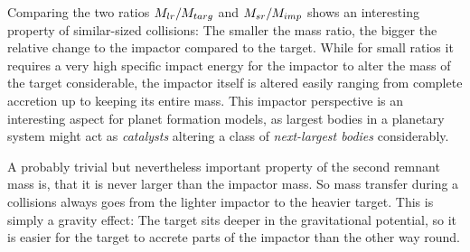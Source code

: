 
Comparing the two ratios $M_{lr} / M_{targ}$ and $M_{sr} / M_{imp}$ shows an interesting property of similar-sized collisions: The smaller the mass ratio, the bigger the relative change to the impactor compared to the target. While for small ratios it requires a very high specific impact energy for the impactor to alter the mass of the target considerable, the impactor itself is altered easily ranging from complete accretion up to keeping its entire mass. This impactor perspective is an interesting aspect for planet formation models, as largest bodies in a planetary system might act as \emph{catalysts} altering a class of \emph{next-largest bodies} \citep{Asphaug:2010p3539} considerably.

A probably trivial but nevertheless important property of the second remnant mass is, that it is never larger than the impactor mass. So mass transfer during a collisions always goes from the lighter impactor to the heavier target. This is simply a gravity effect: The target sits deeper in the gravitational potential, so it is easier for the target to accrete parts of the impactor than the other way round.

